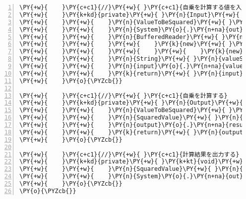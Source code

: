 \begin{Verbatim}[commandchars=\\\{\},numbers=left,firstnumber=1,stepnumber=1,frame=single,fontsize=\small]
\PY{+w}{    }\PY{c+c1}{//}\PY{+w}{ }\PY{c+c1}{自乗を計算する値を入力する}
\PY{+w}{    }\PY{k+kd}{private}\PY{+w}{ }\PY{n}{Input}\PY{+w}{ }\PY{n+nf}{input}\PY{o}{(}\PY{o}{)}\PY{+w}{ }\PY{k+kd}{throws}\PY{+w}{ }\PY{n}{IOException}\PY{+w}{ }\PY{o}{\PYZob{}}
\PY{+w}{    }\PY{+w}{    }\PY{n}{ValueToBeSquared}\PY{+w}{ }\PY{n}{input}\PY{+w}{ }\PY{o}{=}\PY{+w}{ }\PY{k}{new}\PY{+w}{ }\PY{n}{ValueToBeSquared}\PY{o}{(}\PY{o}{)}\PY{o}{;}
\PY{+w}{    }\PY{+w}{    }\PY{n}{System}\PY{o}{.}\PY{n+na}{out}\PY{o}{.}\PY{n+na}{print}\PY{o}{(}\PY{l+s}{"自乗を計算する値を入力してください："}\PY{o}{)}\PY{o}{;}
\PY{+w}{    }\PY{+w}{    }\PY{n}{BufferedReader}\PY{+w}{ }\PY{n}{reader}\PY{+w}{ }\PY{o}{=}
\PY{+w}{    }\PY{+w}{    }\PY{+w}{    }\PY{k}{new}\PY{+w}{ }\PY{n+nf}{BufferedReader}\PY{o}{(}
\PY{+w}{    }\PY{+w}{    }\PY{+w}{    }\PY{+w}{    }\PY{k}{new}\PY{+w}{ }\PY{n+nf}{InputStreamReader}\PY{o}{(}\PY{n}{System}\PY{o}{.}\PY{n+na}{in}\PY{o}{)}\PY{o}{)}\PY{o}{;}
\PY{+w}{    }\PY{+w}{    }\PY{n}{String}\PY{+w}{ }\PY{n}{valueString}\PY{+w}{ }\PY{o}{=}\PY{+w}{ }\PY{n}{reader}\PY{o}{.}\PY{n+na}{readLine}\PY{o}{(}\PY{o}{)}\PY{o}{;}
\PY{+w}{    }\PY{+w}{    }\PY{n}{input}\PY{o}{.}\PY{n+na}{value}\PY{+w}{ }\PY{o}{=}\PY{+w}{ }\PY{n}{Double}\PY{o}{.}\PY{n+na}{parseDouble}\PY{o}{(}\PY{n}{valueString}\PY{o}{)}\PY{o}{;}
\PY{+w}{    }\PY{+w}{    }\PY{k}{return}\PY{+w}{ }\PY{n}{input}\PY{o}{;}
\PY{+w}{    }\PY{o}{\PYZcb{}}

\PY{+w}{    }\PY{c+c1}{//}\PY{+w}{ }\PY{c+c1}{自乗を計算する}
\PY{+w}{    }\PY{k+kd}{private}\PY{+w}{ }\PY{n}{Output}\PY{+w}{ }\PY{n+nf}{process}\PY{o}{(}\PY{n}{Input}\PY{+w}{ }\PY{n}{input}\PY{o}{)}\PY{+w}{ }\PY{o}{\PYZob{}}
\PY{+w}{    }\PY{+w}{    }\PY{n}{ValueToBeSquared}\PY{+w}{ }\PY{n}{vtbs}\PY{+w}{ }\PY{o}{=}\PY{o}{(}\PY{n}{ValueToBeSquared}\PY{o}{)}\PY{+w}{ }\PY{n}{input}\PY{o}{;}
\PY{+w}{    }\PY{+w}{    }\PY{n}{SquaredValue}\PY{+w}{ }\PY{n}{output}\PY{+w}{ }\PY{o}{=}\PY{+w}{ }\PY{k}{new}\PY{+w}{ }\PY{n}{SquaredValue}\PY{o}{(}\PY{o}{)}\PY{o}{;}
\PY{+w}{    }\PY{+w}{    }\PY{n}{output}\PY{o}{.}\PY{n+na}{result}\PY{+w}{ }\PY{o}{=}\PY{+w}{ }\PY{n}{vtbs}\PY{o}{.}\PY{n+na}{value}\PY{+w}{ }\PY{o}{*}\PY{+w}{ }\PY{n}{vtbs}\PY{o}{.}\PY{n+na}{value}\PY{o}{;}
\PY{+w}{    }\PY{+w}{    }\PY{k}{return}\PY{+w}{ }\PY{n}{output}\PY{o}{;}
\PY{+w}{    }\PY{o}{\PYZcb{}}

\PY{+w}{    }\PY{c+c1}{//}\PY{+w}{ }\PY{c+c1}{計算結果を出力する}
\PY{+w}{    }\PY{k+kd}{private}\PY{+w}{ }\PY{k+kt}{void}\PY{+w}{ }\PY{n+nf}{output}\PY{o}{(}\PY{n}{Output}\PY{+w}{ }\PY{n}{output}\PY{o}{)}\PY{+w}{ }\PY{o}{\PYZob{}}
\PY{+w}{    }\PY{+w}{    }\PY{n}{SquaredValue}\PY{+w}{ }\PY{n}{sv}\PY{+w}{ }\PY{o}{=}\PY{+w}{ }\PY{o}{(}\PY{n}{SquaredValue}\PY{o}{)}\PY{+w}{ }\PY{n}{output}\PY{o}{;}
\PY{+w}{    }\PY{+w}{    }\PY{n}{System}\PY{o}{.}\PY{n+na}{out}\PY{o}{.}\PY{n+na}{println}\PY{o}{(}\PY{l+s}{"計算結果："}\PY{+w}{ }\PY{o}{+}\PY{+w}{ }\PY{n}{sv}\PY{o}{.}\PY{n+na}{result}\PY{o}{)}\PY{o}{;}
\PY{+w}{    }\PY{o}{\PYZcb{}}
\PY{o}{\PYZcb{}}
\end{Verbatim}
